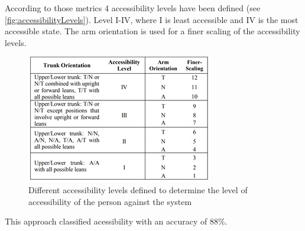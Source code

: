 \documentclass[conference]{IEEEtran}
\begin{document}
According to those metrics 4 accessibility levels\cite{mccoll2012affect} have been defined (see \autoref{fig:accessibilityLevels}). Level I-IV, where I is least accessible and IV is the most accessible state. The arm orientation is used for a finer scaling of the accessibility levels.

\begin{figure}[H]
\centering
\includegraphics[width=\linewidth]{accessibilityLevels.jpg}
\caption{Different accessibility levels defined to determine the level of accessibility of the person against the system\cite{mccoll2012affect}}
\label{fig:accessibilityLevels}
\end{figure}


This approach classified acessibility with an accuracy of 88\%\cite{mccoll2012affect}.
\end{document}
